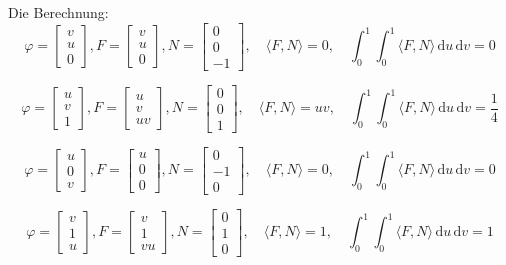 \documentclass[a4paper,10pt,fleqn,twoside]{scrartcl}
\numberwithin{equation}{section}
\theoremstyle{Aufgabe}
\begin{document}
\newpage
\noindent
Die Berechnung:
\[
\varphi = \begin{bmatrix}v\\ u\\ 0\end{bmatrix},
F = \begin{bmatrix}v\\ u\\ 0\end{bmatrix},
N = \begin{bmatrix}0\\ 0\\ -1 \end{bmatrix},
\quad\langle F,N\rangle = 0,
\quad\int_0^1 \int_0^1 \langle F,N\rangle\,\mathrm du\,\mathrm dv = 0
\]

\[
\varphi = \begin{bmatrix}u\\ v\\ 1\end{bmatrix},
F = \begin{bmatrix}u\\ v\\ uv\end{bmatrix},
N = \begin{bmatrix}0\\ 0\\ 1\end{bmatrix},
\quad\langle F,N\rangle = uv,
\quad\int_0^1 \int_0^1 \langle F,N\rangle\,\mathrm du\,\mathrm dv = \frac{1}{4}
\]

\[
\varphi = \begin{bmatrix}u\\ 0\\ v\end{bmatrix},
F = \begin{bmatrix}u\\ 0\\ 0\end{bmatrix},
N = \begin{bmatrix}0\\ -1\\ 0\end{bmatrix},
\quad\langle F,N\rangle = 0,
\quad\int_0^1 \int_0^1 \langle F,N\rangle\,\mathrm du\,\mathrm dv = 0
\]

\[
\varphi = \begin{bmatrix}v\\ 1\\ u\end{bmatrix},
F = \begin{bmatrix}v\\ 1\\ vu\end{bmatrix},
N = \begin{bmatrix}0\\ 1\\ 0\end{bmatrix},
\quad\langle F,N\rangle = 1,
\quad\int_0^1 \int_0^1 \langle F,N\rangle\,\mathrm du\,\mathrm dv = 1
\]
\end{document}
